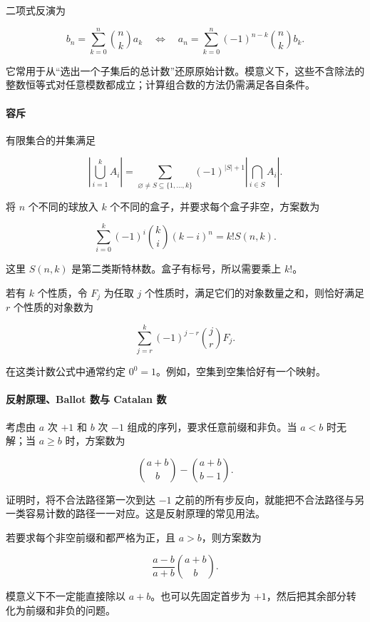 二项式反演为

\[
b_n=\sum_{k=0}^{n}\binom{n}{k}a_k
\quad\Longleftrightarrow\quad
 a_n=\sum_{k=0}^{n}(-1)^{n-k}\binom{n}{k}b_k.
\]

它常用于从``选出一个子集后的总计数''还原原始计数。模意义下，这些不含除法的整数恒等式对任意模数都成立；计算组合数的方法仍需满足各自条件。

\hypertarget{ux5bb9ux65a5}{%
\paragraph{容斥}\label{ux5bb9ux65a5}}

有限集合的并集满足

\[
\left|\bigcup_{i=1}^{k}A_i\right|
=\sum_{\varnothing\ne S\subseteq\{1,\ldots,k\}}
(-1)^{|S|+1}\left|\bigcap_{i\in S}A_i\right|.
\]

将 \(n\) 个不同的球放入 \(k\) 个不同的盒子，并要求每个盒子非空，方案数为

\[
\sum_{i=0}^{k}(-1)^i\binom{k}{i}(k-i)^n=k!S(n,k).
\]

这里 \(S(n,k)\) 是第二类斯特林数。盒子有标号，所以需要乘上 \(k!\)。

若有 \(k\) 个性质，令 \(F_j\) 为任取 \(j\) 个性质时，满足它们的对象数量之和，则恰好满足 \(r\) 个性质的对象数为

\[
\sum_{j=r}^{k}(-1)^{j-r}\binom{j}{r}F_j.
\]

在这类计数公式中通常约定 \(0^0=1\)。例如，空集到空集恰好有一个映射。

\hypertarget{ux53cdux5c04ux539fux7406ballot-ux6570ux4e0e-catalan-ux6570}{%
\paragraph{反射原理、Ballot 数与 Catalan 数}\label{ux53cdux5c04ux539fux7406ballot-ux6570ux4e0e-catalan-ux6570}}

考虑由 \(a\) 次 \(+1\) 和 \(b\) 次 \(-1\) 组成的序列，要求任意前缀和非负。当 \(a<b\) 时无解；当 \(a\ge b\) 时，方案数为

\[
\binom{a+b}{b}-\binom{a+b}{b-1}.
\]

证明时，将不合法路径第一次到达 \(-1\) 之前的所有步反向，就能把不合法路径与另一类容易计数的路径一一对应。这是反射原理的常见用法。

若要求每个非空前缀和都严格为正，且 \(a>b\)，则方案数为

\[
\frac{a-b}{a+b}\binom{a+b}{b}.
\]

模意义下不一定能直接除以 \(a+b\)。也可以先固定首步为 \(+1\)，然后把其余部分转化为前缀和非负的问题。

